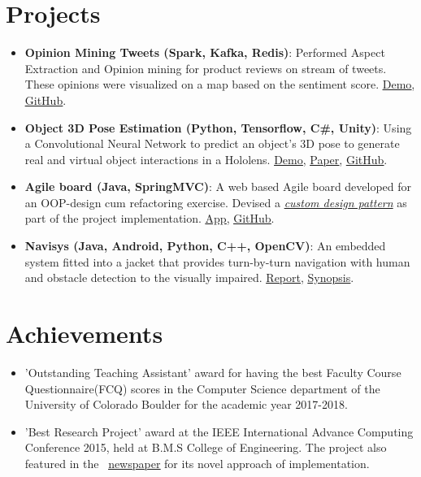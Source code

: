 \documentclass[letterpaper,11pt]{article}
\newcommand{\resumeItem}[2]{
  \linespread{1.1}
	\item\small{
    	\textbf{#1}{: #2}
  	}
}
\newcommand{\resumePoint}[1]{
	\linespread{1.2}
	\item\small{#1}
}
\newcommand{\resumeSubItem}[2]{\resumeItem{#1}{#2}\vspace{-4pt}}
\newcommand{\resumeSubHeadingListStart}{\begin{itemize}[leftmargin=*]}
\newcommand{\resumeSubHeadingListEnd}{\end{itemize}\vspace{-14pt}}
\begin{document}
\section{Projects}
  \resumeSubHeadingListStart
  \resumeSubItem{Opinion Mining Tweets (Spark, Kafka, Redis)}
      {Performed Aspect Extraction and Opinion mining for product reviews on stream of tweets. These opinions were visualized on a map based on the sentiment score.\textbf{\faLink}
      \href{https://drive.google.com/file/d/1zUeC4FPc74mw2Z6SB1qXauo8p6Ex2Cc9/view?usp=sharing}{\underline{Demo}},  \href{https://github.com/nikhilsu/Aspect-Extraction-and-Opinion-Mining}{\underline{GitHub}}.}
    \resumeSubItem{Object 3D Pose Estimation (Python, Tensorflow, C\#, Unity)}
      {Using a Convolutional Neural Network to predict an object\rq s 3D pose to generate real and virtual object interactions in a Hololens. \textbf{\faLink}
      \href{https://drive.google.com/file/d/1kCepKQxR73tUTLuvmd1YL3sIbj1GxDdc/view?usp=sharing}{\underline{Demo}}, \href{https://drive.google.com/file/d/1mRwSJ8p2-g-gtBGl1A8seRB8SojWQphm/view?usp=sharing}{\underline{Paper}}, \href{https://github.com/nikhilsu/Object-location-detection}{\underline{GitHub}}.}
    \resumeSubItem{Agile board (Java, SpringMVC)}
      {A web based Agile board developed for an OOP-design cum refactoring exercise. Devised a \href{https://github.com/nikhilsu/Agile-board/blob/master/src/main/java/com/prorg/helper/result/Response.java}{\emph{custom design pattern}} as part of the project implementation. \textbf{\faLink}
      \href{https://prorg.herokuapp.com}{\underline{App}}, \href{https://github.com/nikhilsu/Agile-board}{\underline{GitHub}}.}
    \resumeSubItem{Navisys (Java, Android, Python, C++, OpenCV)}
      {An embedded system fitted into a jacket that provides turn-by-turn navigation with human and obstacle detection to the visually impaired. \textbf{\faLink}
      \href{https://drive.google.com/file/d/1bFHeZ7-7uwZ0spir3YQ7r0maWdLteEtu/view?usp=sharing}{\underline{Report}},
      \href{https://drive.google.com/file/d/1JWB67U2jjTG7cXZFVjRPVGKsv-rRhgUQ/view?usp=sharing}{\underline{Synopsis}}.}
  \resumeSubHeadingListEnd
\vspace{3pt}
\section{Achievements}
  \resumeSubHeadingListStart
    \resumePoint{'Outstanding Teaching Assistant' award for having the best Faculty Course Questionnaire(FCQ) scores in the Computer Science department of the University of Colorado Boulder for the academic year 2017-2018.}
    \vspace{-5pt}
    \resumePoint{'Best Research Project' award at the IEEE International Advance Computing Conference 2015, held at B.M.S College of Engineering. The project also featured in the \faLink \  \href{https://drive.google.com/open?id=0B0vNhKZyi8qyam1fQ3lfaE1hMkE}{\underline{newspaper}} for its novel approach of implementation.}
  \resumeSubHeadingListEnd
 
\end{document}

